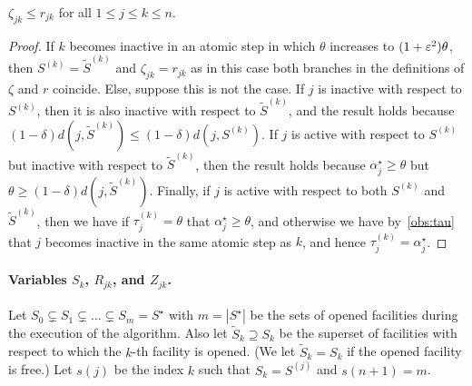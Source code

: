 \begin{observation}
\label{obs:rzdom}
$\zeta_{jk} \leq r_{jk}$ for all $1 \leq j \leq k \leq n$.
\end{observation}
\begin{proof}
If $k$ becomes inactive in an atomic step in which $\theta$ increases to $(1+\varepsilon^2)\theta$, then $S^{(k)} = \tilde{S}^{(k)}$ and $\zeta_{jk} = r_{jk}$ as in this case both branches in the definitions of $\zeta$ and $r$ coincide.
Else, suppose this is not the case.
If $j$ is inactive with respect to $S^{(k)}$, then it is also inactive with respect to $\tilde{S}^{(k)}$, and the result holds because $(1-\delta) d(j, \tilde{S}^{(k)}) \leq (1-\delta) d(j, S^{(k)})$.
If $j$ is active with respect to $S^{(k)}$ but inactive with respect to $\tilde{S}^{(k)}$, then the result holds because $\alpha_j^\star \geq \theta$ but $\theta \geq (1-\delta)d(j, \tilde{S}^{(k)})$.
Finally, if $j$ is active with respect to both $S^{(k)}$ and $\tilde{S}^{(k)}$, then we have if $\tau_j^{(k)} = \theta$ that $\alpha^\star_j \geq \theta$, and otherwise we have by~\ref{obs:tau} that $j$ becomes inactive in the same atomic step as $k$, and hence $\tau_j^{(k)} = \alpha_j^\star$.
\end{proof}

\paragraph{Variables $S_k$, $R_{jk}$, and $Z_{jk}$.}
Let $S_0 \subsetneq S_1 \subsetneq \ldots \subsetneq S_m = S^\star$ with $m = |S^\star|$ be the sets of opened facilities during the execution of the algorithm.
Also let $\tilde{S}_k \supseteq S_k$ be the superset of facilities with respect to which the $k$-th facility is opened. (We let $\tilde{S}_k = S_k$ if the opened facility is free.)
Let $s(j)$ be the index $k$ such that $S_k = S^{(j)}$ and $s(n+1)=m$.

